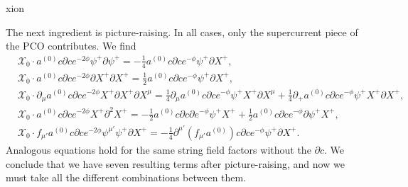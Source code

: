 xion\documentclass[12pt]{article}
\def\ie{\begin{equation}\begin{aligned}}
\def\fe{\end{aligned}\end{equation}}
\numberwithin{equation}{section}
\begin{document}
The next ingredient is picture-raising. In all cases, only the supercurrent piece of the PCO contributes. We find
\ie
    &\mathcal{X}_0\cdot a^{(0)}c\partial ce^{-2\phi}\psi^+\partial\psi^+=-\frac{1}{4}a^{(0)}c\partial ce^{-\phi}\psi^+\partial X^+,\\
    &\mathcal{X}_0\cdot a^{(0)}c\partial ce^{-2\phi}\partial X^+\partial X^+=\frac{1}{2}a^{(0)}c\partial ce^{-\phi}\psi^+\partial X^+,\\
    &\mathcal{X}_0\cdot \partial_{\mu}a^{(0)}c\partial ce^{-2\phi}X^+\partial X^+\partial X^{\mu}=\frac{1}{4}\partial_{\mu}a^{(0)}c\partial ce^{-\phi}\psi^+X^+\partial X^{\mu}+\frac{1}{4}\partial_+a^{(0)}c\partial ce^{-\phi}\psi^+X^+\partial X^+,\\
    &\mathcal{X}_0\cdot a^{(0)}c\partial ce^{-2\phi}X^+\partial^2 X^+=-\frac{1}{2}a^{(0)}c\partial c\partial e^{-\phi}\psi^+X^++\frac{1}{2}a^{(0)}c\partial ce^{-\phi}\partial\psi^+X^+,\\
    &\mathcal{X}_0\cdot f_{\mu'}a^{(0)}c\partial ce^{-2\phi}\psi^{\mu'}\psi^+\partial X^+=-\frac{1}{4}\partial^{\mu'}(f_{\mu'}a^{(0)})c\partial ce^{-\phi}\psi^+\partial X^+.
\fe
Analogous equations hold for the same string field factors without the $\partial c$. We conclude that
we have seven resulting terms after picture-raising, and now we must take all the different
combinations between them.
\end{document}
